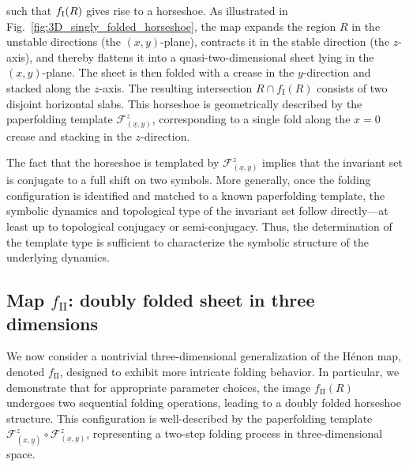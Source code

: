 \documentclass[12pt]{iopart}
\begin{document}
such that $f_{\rm I}(R)$ gives rise to a horseshoe. As illustrated in Fig.~\ref{fig:3D_singly_folded_horseshoe}, the map expands the region \( R \) in the unstable directions (the \( (x,y) \)-plane), contracts it in the stable direction (the \( z \)-axis), and thereby flattens it into a quasi-two-dimensional sheet lying in the \( (x,y) \)-plane. The sheet is then folded with a crease in the \( y \)-direction and stacked along the \( z \)-axis. The resulting intersection \( R \cap f_{\mathrm{I}}(R) \) consists of two disjoint horizontal slabs. This horseshoe is geometrically described by the paperfolding template \( \mathcal{F}^z_{(\underline{x},y)} \), corresponding to a single fold along the \( x = 0 \) crease and stacking in the \( z \)-direction.

The fact that the horseshoe is templated by \( \mathcal{F}^z_{(\underline{x},y)} \) implies that the invariant set is conjugate to a full shift on two symbols. More generally, once the folding configuration is identified and matched to a known paperfolding template, the symbolic dynamics and topological type of the invariant set follow directly—at least up to topological conjugacy or semi-conjugacy. Thus, the determination of the template type is sufficient to characterize the symbolic structure of the underlying dynamics.



\subsection{Map \( f_{\mathrm{II}} \): doubly folded sheet in three dimensions}
\label{f II}

We now consider a nontrivial three-dimensional generalization of the Hénon map, denoted \( f_{\mathrm{II}} \), designed to exhibit more intricate folding behavior. In particular, we demonstrate that for appropriate parameter choices, the image \( f_{\mathrm{II}}(R) \) undergoes two sequential folding operations, leading to a doubly folded horseshoe structure. This configuration is well-described by the paperfolding template \( \mathcal{F}^z_{(x,\underline{y})} \circ \mathcal{F}^z_{(\underline{x},y)} \), representing a two-step folding process in three-dimensional space.
\end{document}
